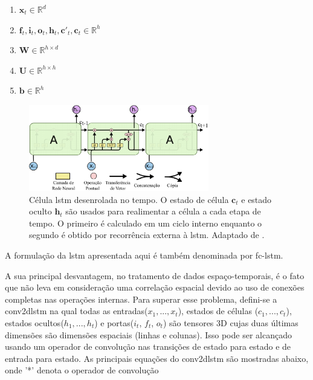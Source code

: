 \begin{enumerate}
	\item $\textbf{x}_t \in \mathbb{R}^{d}$
	\item $\textbf{f}_t,\textbf{i}_t,\textbf{o}_t,\textbf{h}_t,\textbf{c}'_t,\textbf{c}_t \in \mathbb{R}^{h}$ 
	\item $\textbf{W} \in \mathbb{R}^{h \times d} $
	\item $\textbf{U} \in \mathbb{R}^{h \times h}$
	\item $\textbf{b} \in \mathbb{R}^{h}$
\end{enumerate}

\begin{figure}[h]
	\centering
	\includegraphics[width=0.7\textwidth]{figuras/lstm_no_tempo.pdf}
	\caption[Célula \acrshort{lstm} no tempo]{Célula \acrshort{lstm} desenrolada no tempo. O estado de célula $\textbf{c}_{t}$ e estado oculto $\textbf{h}_{t}$ são usados para realimentar a célula a cada etapa de tempo. O primeiro é calculado em um ciclo interno enquanto o segundo é obtido por recorrência externa à \acrshort{lstm}. Adaptado de \cite{Olah}.}
	\label{fig:lstm_time}
\end{figure}

A formulação da \acrshort{lstm} apresentada aqui é também denominada por \gls{fc-lstm}.

A sua principal desvantagem, no tratamento de dados espaço-temporais, é o fato que não leva em consideração uma correlação espacial devido ao uso de conexões completas nas operações internas.  
Para superar esse problema, defini-se a \gls{conv2dlstm} \cite{xingjian2015convolutional,FullResolution2017Toderici} na qual todas as entradas($x_1,..., x_t$), estados de células ($c_1,..., c_t$), estados ocultos($h_1,..., h_t$) e portas($i_t$, $f_t$, $o_t$) são tensores 3D cujas duas últimas dimensões são dimensões espaciais (linhas e colunas). Isso pode ser alcançado usando um operador de convolução nas transições de estado para estado e de entrada para estado. As principais equações do \acrshort{conv2dlstm} são mostradas abaixo, onde '*' denota o operador de convolução

